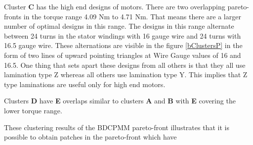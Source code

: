 
Cluster \textbf{C} has the high end designs of motors. There are two 
overlapping pareto-fronts in the torque range 4.09 Nm to 4.71 Nm. That
means there are a larger number of optimal designs in this range. The
designs in this range alternate between 24 turns in the stator 
windings with 16 gauge wire and 24 turns with 16.5 gauge wire. These 
alternations are visible in the figure \ref{bClustersP} in the form of
two lines of upward pointing triangles at Wire Gauge values of 16 and
16.5. One thing that sets apart these designs from all others is that 
they all use lamination type Z whereas all others use lamination type 
Y. This implies that Z type laminations are useful only for high end
motors.

Clusters \textbf{D} have \textbf{E} overlaps similar to clusters 
\textbf{A} and \textbf{B} with \textbf{E} covering the lower torque 
range. 


These clustering results of the BDCPMM pareto-front illustrates that 
it is possible to obtain patches in the pareto-front which have 



